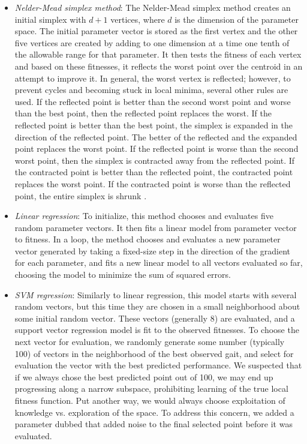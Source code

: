\begin{itemize}
\item \emph{Nelder-Mead simplex method}: The Nelder-Mead simplex
  method \cite{nm} creates an initial simplex with $d+1$ vertices,
  where $d$ is the dimension of the parameter space. The initial
  parameter vector is stored as the first vertex and the other five
  vertices are created by adding to one dimension at a time one tenth
  of the allowable range for that parameter. It then tests the fitness
  of each vertex and based on these fitnesses, it reflects the worst
  point over the centroid in an attempt to improve it.  In general,
  the worst vertex is reflected; however, to prevent cycles and
  becoming stuck in local minima, several other rules are used.  If
  the reflected point is better than the second worst point and worse
  than the best point, then the reflected point replaces the worst. If
  the reflected point is better than the best point, the simplex is
  expanded in the direction of the reflected point. The better of the
  reflected and the expanded point replaces the worst point. If the
  reflected point is worse than the second worst point, then the
  simplex is contracted away from the reflected point. If the
  contracted point is better than the reflected point, the contracted
  point replaces the worst point. If the contracted point is worse
  than the reflected point, the entire simplex is shrunk \cite{nm}.

\item \emph{Linear regression}: To initialize, this method chooses and
  evaluates five random parameter vectors. It then fits a linear model
  from parameter vector to fitness. In a loop, the method chooses and
  evaluates a new parameter vector generated by taking a fixed-size
  step in the direction of the gradient for each parameter, and fits a
  new linear model to all vectors evaluated so far, choosing the model
  to minimize the sum of squared errors.

\item \emph{SVM regression}: Similarly to linear regression, this
  model starts with several random vectors, but this time they are
  chosen in a small neighborhood about some initial random vector.
  These vectors (generally 8) are evaluated, and a support vector
  regression model is fit to the observed fitnesses.  To choose the
  next vector for evaluation, we randomly generate some number
  (typically 100) of vectors in the neighborhood of the best observed
  gait, and select for evaluation the vector with the best predicted
  performance.  We suspected that if we always chose the best
  predicted point out of 100, we may end up progressing along a narrow
  subspace, prohibiting learning of the true local fitness function.
  Put another way, we would always choose exploitation of knowledge
  vs. exploration of the space.  To address this concern, we added a
  parameter dubbed  that added noise to the final
  selected point before it was evaluated.


\end{itemize}
